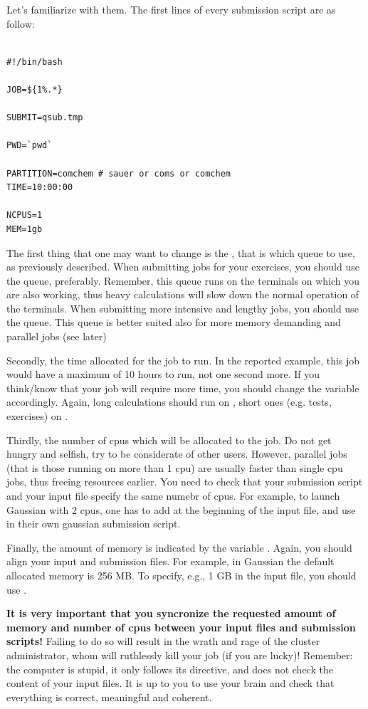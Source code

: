\documentclass{article}
\begin{document}
Let's familiarize with them. The first lines of every submission script are as follow:

\begin{verbatim}

#!/bin/bash

JOB=${1%.*}

SUBMIT=qsub.tmp

PWD=`pwd`

PARTITION=comchem # sauer or coms or comchem
TIME=10:00:00

NCPUS=1
MEM=1gb

\end{verbatim}

The first thing that one may want to change is the , that is which queue to use, as previously described.
When submitting jobs for your exercises, you should use the  queue, preferably.
Remember, this queue runs on the terminals on which you are also working, thus heavy calculations will slow down the normal operation
of the terminals.
When submitting more intensive and lengthy jobs, you should use the  queue. This queue is better suited also for more memory demanding
and parallel jobs (see later)

Secondly, the time allocated for the job to run. In the reported example, this job would have a maximum of 10 hours to run, not one second more.
If you think/know that your job will require more time, you should change the variable  accordingly.
Again, long calculations should run on , short ones (e.g. tests, exercises) on .

Thirdly, the number of cpus which will be allocated to the job. Do not get hungry and selfish, try to be considerate of other users.
However, parallel jobs (that is those running on more than 1 cpu) are usually faster than single cpu jobs, thus freeing resources earlier. You need to
check that your submission script and your input file specify the same numebr of cpus. For example, to launch Gaussian with 2 cpus, one has to add
 at the beginning of the input file, and use  in their own gaussian submission script.

Finally, the amount of memory is indicated by the variable . Again, you should align your input and submission files.
For example, in Gaussian the default allocated memory is 256 MB. To specify, e.g., 1 GB in the input file, you should use .

{\bf It is very important that you syncronize the requested amount of memory and number of cpus between your input files and submission scripts!}
Failing to do so will result in the wrath and rage of the cluster administrator, whom will ruthlessly kill your job (if you are lucky)!
Remember: the computer is stupid, it only follows its directive, and does not check the content of your input files.
It is up to you to use your brain and check that everything is correct, meaningful and coherent.
\end{document}
